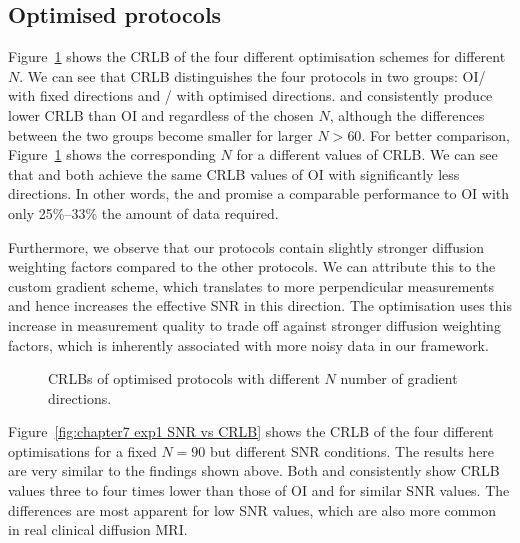 \subsection{Optimised protocols}
Figure~\ref{fig:chapter7 exp1 DIRS vs CRLB} shows the CRLB of the four different optimisation schemes for different $N$. We can see that CRLB distinguishes the four protocols in two groups: {\gls{OI}}/{\SD} with fixed directions and {\DO}/{\FD} with optimised directions. {\DO} and {\FD} consistently produce lower CRLB than {\gls{OI}} and {\SD} regardless of the chosen $N$, although the differences between the two groups become smaller for larger $N > 60$. For better comparison, Figure~\ref{fig:chapter7 exp1 DIRS vs CRLB} shows the corresponding $N$ for a different values of CRLB. We can see that {\FD} and {\DO} both achieve the same CRLB values of {\gls{OI}} with significantly less directions. In other words, the {\DO} and {\FD} promise a comparable performance to {\gls{OI}} with only 25\%--33\% the amount of data required.

Furthermore, we observe that our {\FD} protocols contain slightly stronger diffusion weighting factors compared to the other protocols. We can attribute this to the custom gradient scheme, which translates to more perpendicular measurements and hence increases the effective SNR in this direction. The optimisation uses this increase in measurement quality to trade off against stronger diffusion weighting factors, which is inherently associated with more noisy data in our framework.
\begin{figure}[H]
	\centering
	
	\caption{CRLBs of optimised protocols with different $N$  number of gradient directions.}
	\label{fig:chapter7 exp1 DIRS vs CRLB}
\end{figure}

Figure~\ref{fig:chapter7 exp1 SNR vs CRLB} shows the CRLB of the four different optimisations for a fixed $N=90$ but different \gls{SNR} conditions. The results here are very similar to the findings shown above. Both {\FD} and {\DO} consistently show CRLB values three to four times lower than those of {\gls{OI}} and {\SD} for similar \gls{SNR} values. The differences are most apparent for low \gls{SNR} values, which are also more common in real clinical diffusion MRI.

